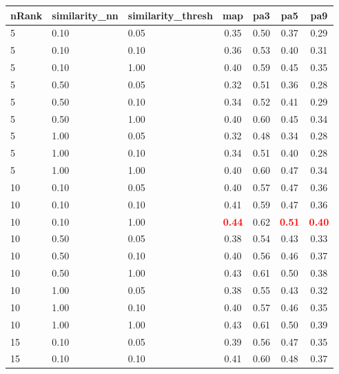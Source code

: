 \documentclass[12pt,a4paper,fleqn]{tufte-handout}
\begin{document}
 
\begin{table}                  
\begin{center}                  
\scriptsize                  
\setlength{\tabcolsep}{.16667em}                  
\begin{tabular}{lllcccc}                  
nRank & similarity\_nn & similarity\_thresh & map & pa3 & pa5 & pa9 \\                  
\hline                  
5 & 0.10 & 0.05 & 0.35 & 0.50 & 0.37 & 0.29 \\                  
5 & 0.10 & 0.10 & 0.36 & 0.53 & 0.40 & 0.31 \\                  
5 & 0.10 & 1.00 & 0.40 & 0.59 & 0.45 & 0.35 \\                  
5 & 0.50 & 0.05 & 0.32 & 0.51 & 0.36 & 0.28 \\                  
5 & 0.50 & 0.10 & 0.34 & 0.52 & 0.41 & 0.29 \\                  
5 & 0.50 & 1.00 & 0.40 & 0.60 & 0.45 & 0.34 \\                  
5 & 1.00 & 0.05 & 0.32 & 0.48 & 0.34 & 0.28 \\                  
5 & 1.00 & 0.10 & 0.34 & 0.51 & 0.40 & 0.28 \\                  
5 & 1.00 & 1.00 & 0.40 & 0.60 & 0.47 & 0.34 \\                  
10 & 0.10 & 0.05 & 0.40 & 0.57 & 0.47 & 0.36 \\                  
10 & 0.10 & 0.10 & 0.41 & 0.59 & 0.47 & 0.36 \\                  
10 & 0.10 & 1.00 & \textbf{\textcolor{red}{0.44}} & 0.62 & \textbf{\textcolor{red}{0.51}} & \textbf{\textcolor{red}{0.40}} \\                  
10 & 0.50 & 0.05 & 0.38 & 0.54 & 0.43 & 0.33 \\                  
10 & 0.50 & 0.10 & 0.40 & 0.56 & 0.46 & 0.37 \\                  
10 & 0.50 & 1.00 & 0.43 & 0.61 & 0.50 & 0.38 \\                  
10 & 1.00 & 0.05 & 0.38 & 0.55 & 0.43 & 0.32 \\                  
10 & 1.00 & 0.10 & 0.40 & 0.57 & 0.46 & 0.35 \\                  
10 & 1.00 & 1.00 & 0.43 & 0.61 & 0.50 & 0.39 \\                  
15 & 0.10 & 0.05 & 0.39 & 0.56 & 0.47 & 0.35 \\                  
15 & 0.10 & 0.10 & 0.41 & 0.60 & 0.48 & 0.37 \\                  

\end{tabular}
\end{center}
\end{table}
\end{document}
